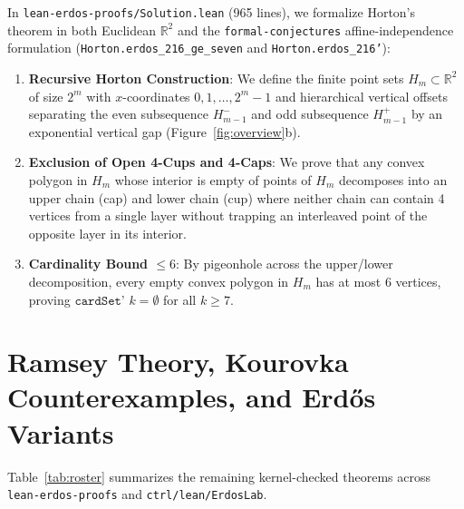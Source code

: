 \documentclass[10pt,twocolumn]{article}
\theoremstyle{definition}
\begin{document}
In \texttt{lean-erdos-proofs/Solution.lean} (965 lines), we formalize Horton's theorem in both Euclidean $\mathbb{R}^2$ and the \texttt{formal-conjectures} affine-independence formulation (\texttt{Horton.erdos\_216\_ge\_seven} and \texttt{Horton.erdos\_216'}):
\begin{enumerate}[leftmargin=1.4em,itemsep=1pt]
  \item \textbf{Recursive Horton Construction}: We define the finite point sets $H_m \subset \mathbb{R}^2$ of size $2^m$ with $x$-coordinates $0, 1, \dots, 2^m - 1$ and hierarchical vertical offsets separating the even subsequence $H_{m-1}^-$ and odd subsequence $H_{m-1}^+$ by an exponential vertical gap (Figure~\ref{fig:overview}b).
  \item \textbf{Exclusion of Open 4-Cups and 4-Caps}: We prove that any convex polygon in $H_m$ whose interior is empty of points of $H_m$ decomposes into an upper chain (cap) and lower chain (cup) where neither chain can contain 4 vertices from a single layer without trapping an interleaved point of the opposite layer in its interior.
  \item \textbf{Cardinality Bound $\le 6$}: By pigeonhole across the upper/lower decomposition, every empty convex polygon in $H_m$ has at most $6$ vertices, proving $\texttt{cardSet' } k = \emptyset$ for all $k \ge 7$.
\end{enumerate}

\section{Ramsey Theory, Kourovka Counterexamples, and Erd\H{o}s Variants}

Table~\ref{tab:roster} summarizes the remaining kernel-checked theorems across \texttt{lean-erdos-proofs} and \texttt{ctrl/lean/ErdosLab}.
\end{document}
